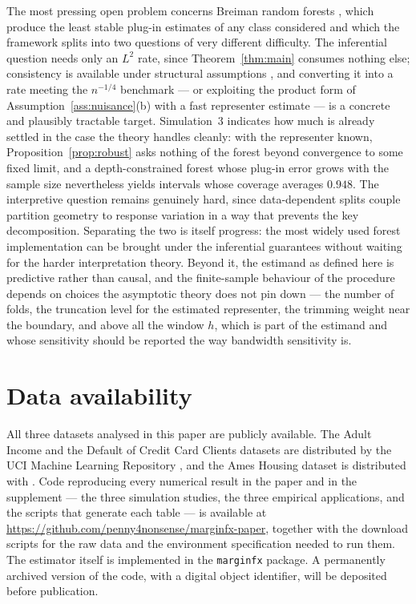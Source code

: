 \documentclass[12pt,a4paper]{article}
\numberwithin{equation}{section}
\theoremstyle{plain}
\theoremstyle{definition}
\begin{document}
	The most pressing open problem concerns Breiman random forests
	\citep{breiman2001rf}, which produce the least stable plug-in estimates of
	any class considered and which the framework splits into two questions of
	very different difficulty. The inferential question needs only an $L^2$ rate,
	since Theorem~\ref{thm:main} consumes nothing else; consistency is available
	under structural assumptions \citep{scornet2015forests}, and converting it
	into a rate meeting the $n^{-1/4}$ benchmark --- or exploiting the product
	form of Assumption~\ref{ass:nuisance}(b) with a fast representer estimate ---
	is a concrete and plausibly tractable target. Simulation~3 indicates how much
	is already settled in the case the theory handles cleanly: with the
	representer known, Proposition~\ref{prop:robust} asks nothing of the forest
	beyond convergence to some fixed limit, and a depth-constrained forest whose
	plug-in error grows with the sample size nevertheless yields intervals whose
	coverage averages $0.948$. The interpretive question remains genuinely hard,
	since data-dependent splits couple partition geometry to response variation
	in a way that prevents the key decomposition. Separating the two is itself
	progress: the most widely used forest implementation can be brought under the
	inferential guarantees without waiting for the harder interpretation theory.
	Beyond it, the estimand as defined here is predictive rather than causal, and
	the finite-sample behaviour of the procedure depends on choices the
	asymptotic theory does not pin down --- the number of folds, the truncation
	level for the estimated representer, the trimming weight near the boundary,
	and above all the window $h$, which is part of the estimand and whose
	sensitivity should be reported the way bandwidth sensitivity is.

\section*{Data availability}

All three datasets analysed in this paper are publicly available. The Adult
Income and the Default of Credit Card Clients datasets are distributed by the
UCI Machine Learning Repository \citep{UCI}, and the Ames Housing dataset is
distributed with \citet{decock2011}. Code reproducing every numerical result in
the paper and in the supplement --- the three simulation studies, the three
empirical applications, and the scripts that generate each table --- is
available at \url{https://github.com/penny4nonsense/marginfx-paper}, together
with the download scripts for the raw data and the environment specification
needed to run them. The estimator itself is implemented in the
\texttt{marginfx} package.
A permanently archived version of the code, with a digital object identifier,
will be deposited before publication.
\end{document}
